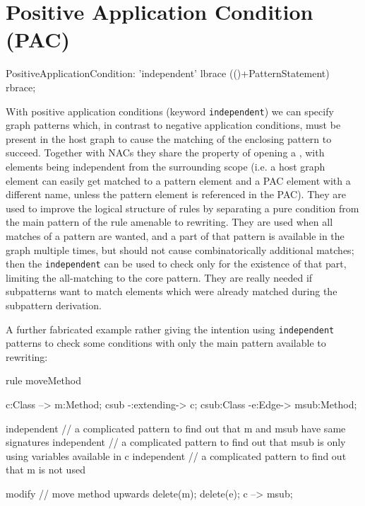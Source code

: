 

\section{Positive Application Condition (PAC)}
 \label{pac}

\begin{rail}  
  PositiveApplicationCondition: 
    'independent' lbrace (()+PatternStatement) rbrace;
\end{rail}

With positive application conditions (keyword \texttt{independent}) we can specify graph patterns which, in contrast to negative application conditions, must be present in the host graph to cause the matching of the enclosing pattern to succeed.
Together with NACs they share the property of opening a , with elements being independent from the surrounding scope (i.e. a host graph element can easily get matched to a pattern element and a PAC element with a different name, unless the pattern element is referenced in the PAC). 
They are used to improve the logical structure of rules by separating a pure condition from the main pattern of the rule amenable to rewriting.
They are used when all matches of a pattern are wanted, and a part of that pattern is available in the graph multiple times, but should not cause combinatorically additional matches; then the \texttt{independent} can be used to check only for the existence of that part, limiting the all-matching to the core pattern.
They are really needed if subpatterns want to match elements which were already matched during the subpattern derivation.

\begin{example}
  A further fabricated example rather giving the intention using \texttt{independent} patterns to check some conditions with only the main pattern available to rewriting:

  \begin{grgen}
rule moveMethod
{
  c:Class --> m:Method;
  csub -:extending-> c;
  csub:Class -e:Edge-> msub:Method;
  
  independent {
    // a complicated pattern to find out that m and msub have same signatures
  }
  independent {
    // a complicated pattern to find out that msub is only using variables available in c
  }
  independent {
    // a complicated pattern to find out that m is not used
  }
 
  modify { // move method upwards
    delete(m);
    delete(e);
    c --> msub;
  }
}
  \end{grgen}
\end{example}

